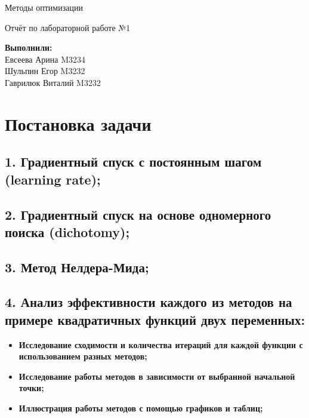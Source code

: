 \documentclass{article}
\begin{document}
\begin{titlepage}
    \bfseries 
        {\centering
            \vspace*{14em}
            \Huge Методы оптимизации\par
            \bigbreak
            Отчёт по лабораторной работе №1 \par
        }
    \vspace{20em}
    \begin{spacing}{2}
        \begin{flushright}
            {\Large \textbf{Выполнили:}}  \\
            {\large Евсеева Арина M3234} \\
            {\large Шульпин Егор M3232} \\
            {\large Гаврилюк Виталий M3232} \\ 
        \end{flushright}
    \end{spacing}
\end{titlepage}

\newpage
\section*{Постановка задачи}
\subsection*{1. Градиентный спуск с постоянным шагом (learning rate);}
\subsection*{2. Градиентный спуск на основе одномерного поиска (dichotomy);}
\subsection*{3. Метод Нелдера-Мида;}
\subsection*{4. Анализ эффективности каждого из методов на примере квадратичных функций двух переменных:}
\begin{itemize}
    \item \textbf{Исследование сходимости и количества итераций для каждой функции с использованием разных методов;}
    \item \textbf{Исследование работы методов в зависимости от выбранной начальной точки;}
    \item \textbf{Иллюстрация работы методов с помощью графиков и таблиц;}
\end{itemize}
\end{document}
